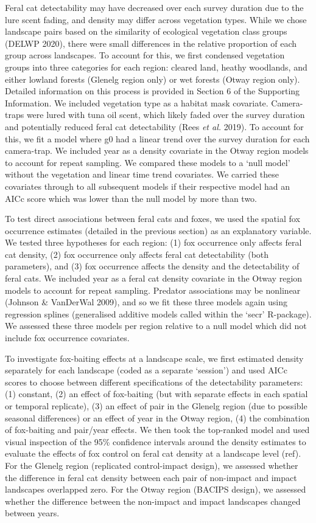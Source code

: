 \documentclass[]{elsarticle} %
\begin{document}
Feral cat detectability may have decreased over each survey duration due to the lure scent fading, and density may differ across vegetation types. While we chose landscape pairs based on the similarity of ecological vegetation class groups (DELWP 2020), there were small differences in the relative proportion of each group across landscapes. To account for this, we first condensed vegetation groups into three categories for each region: cleared land, heathy woodlands, and either lowland forests (Glenelg region only) or wet forests (Otway region only). Detailed information on this process is provided in Section 6 of the Supporting Information. We included vegetation type as a habitat mask covariate. Camera-traps were lured with tuna oil scent, which likely faded over the survey duration and potentially reduced feral cat detectability (Rees \emph{et al.} 2019). To account for this, we fit a model where g0 had a linear trend over the survey duration for each camera-trap. We included year as a density covariate in the Otway region models to account for repeat sampling. We compared these models to a `null model' without the vegetation and linear time trend covariates. We carried these covariates through to all subsequent models if their respective model had an AICc score which was lower than the null model by more than two.

To test direct associations between feral cats and foxes, we used the spatial fox occurrence estimates (detailed in the previous section) as an explanatory variable. We tested three hypotheses for each region: (1) fox occurrence only affects feral cat density, (2) fox occurrence only affects feral cat detectability (both parameters), and (3) fox occurrence affects the density and the detectability of feral cats. We included year as a feral cat density covariate in the Otway region models to account for repeat sampling. Predator associations may be nonlinear (Johnson \& VanDerWal 2009), and so we fit these three models again using regression splines (generalised additive models called within the `secr' R-package). We assessed these three models per region relative to a null model which did not include fox occurrence covariates.

To investigate fox-baiting effects at a landscape scale, we first estimated density separately for each landscape (coded as a separate `session') and used AICc scores to choose between different specifications of the detectability parameters: (1) constant, (2) an effect of fox-baiting (but with separate effects in each spatial or temporal replicate), (3) an effect of pair in the Glenelg region (due to possible seasonal differences) or an effect of year in the Otway region, (4) the combination of fox-baiting and pair/year effects. We then took the top-ranked model and used visual inspection of the 95\% confidence intervals around the density estimates to evaluate the effects of fox control on feral cat density at a landscape level (ref). For the Glenelg region (replicated control-impact design), we assessed whether the difference in feral cat density between each pair of non-impact and impact landscapes overlapped zero. For the Otway region (BACIPS design), we assessed whether the difference between the non-impact and impact landscapes changed between years.
\end{document}
